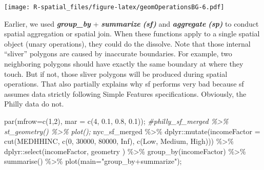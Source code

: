 \documentclass[
  11pt,
]{book}
\newenvironment{Shaded}{\begin{snugshade}}{\end{snugshade}}
\newcommand{\AttributeTok}[1]{\textcolor[rgb]{0.77,0.63,0.00}{#1}}
\newcommand{\CommentTok}[1]{\textcolor[rgb]{0.56,0.35,0.01}{\textit{#1}}}
\newcommand{\ConstantTok}[1]{\textcolor[rgb]{0.00,0.00,0.00}{#1}}
\newcommand{\DecValTok}[1]{\textcolor[rgb]{0.00,0.00,0.81}{#1}}
\newcommand{\FloatTok}[1]{\textcolor[rgb]{0.00,0.00,0.81}{#1}}
\newcommand{\FunctionTok}[1]{\textcolor[rgb]{0.00,0.00,0.00}{#1}}
\newcommand{\NormalTok}[1]{#1}
\newcommand{\SpecialCharTok}[1]{\textcolor[rgb]{0.00,0.00,0.00}{#1}}
\newcommand{\StringTok}[1]{\textcolor[rgb]{0.31,0.60,0.02}{#1}}
\begin{document}
\texttt{[image: R-spatial\_files/figure-latex/geomOperationsBG-6.pdf]}

Earlier, we used \textbf{\emph{group\_by}} + \textbf{\emph{summarize}} \textbf{\emph{(sf)}} and \textbf{\emph{aggregate}} \textbf{\emph{(sp)}} to conduct spatial aggregation or spatial join. When these functions apply to a single spatial object (unary operations), they could do the dissolve. Note that those internal ``sliver'' polygons are caused by inaccurate boundaries. For example, two neighboring polygons should have exactly the same boundary at where they touch. But if not, those sliver polygons will be produced during spatial operations. That also partially explains why sf performs very bad because sf assumes data strictly following Simple Features specifications. Obviously, the Philly data do not.

\begin{Shaded}
\begin{Highlighting}[]
\FunctionTok{par}\NormalTok{(}\AttributeTok{mfrow=}\FunctionTok{c}\NormalTok{(}\DecValTok{1}\NormalTok{,}\DecValTok{2}\NormalTok{), }\AttributeTok{mar =} \FunctionTok{c}\NormalTok{(}\DecValTok{4}\NormalTok{, }\FloatTok{0.1}\NormalTok{, }\FloatTok{0.8}\NormalTok{, }\FloatTok{0.1}\NormalTok{));}
\CommentTok{\#philly\_sf\_merged \%\textgreater{}\% st\_geometry() \%\textgreater{}\% plot();}
\NormalTok{nyc\_sf\_merged }\SpecialCharTok{\%\textgreater{}\%} 
\NormalTok{  dplyr}\SpecialCharTok{::}\FunctionTok{mutate}\NormalTok{(}\AttributeTok{incomeFactor =} \FunctionTok{cut}\NormalTok{(MEDHHINC, }
                                   \FunctionTok{c}\NormalTok{(}\DecValTok{0}\NormalTok{, }\DecValTok{30000}\NormalTok{, }\DecValTok{80000}\NormalTok{, }\ConstantTok{Inf}\NormalTok{), }
                                   \FunctionTok{c}\NormalTok{(}\StringTok{\textquotesingle{}Low\textquotesingle{}}\NormalTok{, }\StringTok{\textquotesingle{}Medium\textquotesingle{}}\NormalTok{, }\StringTok{\textquotesingle{}High\textquotesingle{}}\NormalTok{))) }\SpecialCharTok{\%\textgreater{}\%}
\NormalTok{  dplyr}\SpecialCharTok{::}\FunctionTok{select}\NormalTok{(incomeFactor, geometry ) }\SpecialCharTok{\%\textgreater{}\%}
  \FunctionTok{group\_by}\NormalTok{(incomeFactor) }\SpecialCharTok{\%\textgreater{}\%}
  \FunctionTok{summarise}\NormalTok{() }\SpecialCharTok{\%\textgreater{}\%} \FunctionTok{plot}\NormalTok{(}\AttributeTok{main=}\StringTok{"group\_by+summarize"}\NormalTok{);}
\end{Highlighting}
\end{Shaded}
\end{document}
